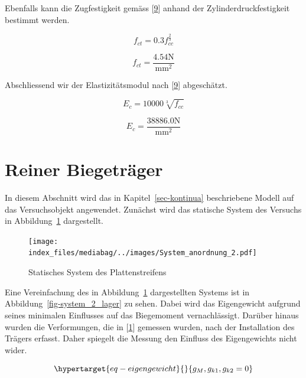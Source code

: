 \documentclass[
  12pt,
  letterpaper,
  egregdoesnotlikesansseriftitles]{scrreprt}
\begin{document}
Ebenfalls kann die Zugfestigkeit gemäss
{[}\protect\hyperlink{ref-Jaeger2013}{9}{]} anhand der
Zylinderdruckfestigkeit bestimmt werden.

\begin{equation}f_{ct} = 0.3 f_{cc}^{\frac{2}{3}}\end{equation}

\begin{equation}f_{ct} = \frac{4.54 \text{N}}{\text{mm}^{2}}\end{equation}

Abschliessend wir der Elastizitätsmodul nach
{[}\protect\hyperlink{ref-Jaeger2013}{9}{]} abgeschätzt.

\begin{equation}E_{c} = 10000 \sqrt[3]{f_{cc}}\end{equation}

\begin{equation}E_{c} = \frac{38886.0 \text{N}}{\text{mm}^{2}}\end{equation}

\hypertarget{reiner-biegetruxe4ger}{%
\section{Reiner Biegeträger}\label{reiner-biegetruxe4ger}}

In diesem Abschnitt wird das in Kapitel~\ref{sec-kontinua} beschriebene
Modell auf das Versuchsobjekt angewendet. Zunächst wird das statische
System des Versuchs in Abbildung~\ref{fig-system_2} dargestellt.

\begin{figure}[H]

{\centering \texttt{[image: index\_files/mediabag/../images/System\_anordnung\_2.pdf]}

}

\caption{\label{fig-system_2}Statisches System des Plattenstreifens}

\end{figure}

Eine Vereinfachung des in Abbildung~\ref{fig-system_2} dargestellten
Systems ist in Abbildung~\ref{fig-system_2_lager} zu sehen. Dabei wird
das Eigengewicht aufgrund seines minimalen Einflusses auf das
Biegemoment vernachlässigt. Darüber hinaus wurden die Verformungen, die
in {[}\protect\hyperlink{ref-Jaeger2006}{1}{]} gemessen wurden, nach der
Installation des Trägers erfasst. Daher spiegelt die Messung den
Einfluss des Eigengewichts nicht wider.

\begin{equation}\protect\hypertarget{eq-eigengewicht}{}{
g_M, g_{k1}, g_{k2} = 0
}\label{eq-eigengewicht}\end{equation}
\end{document}
